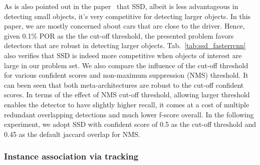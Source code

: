 \documentclass[10pt,twocolumn,letterpaper]{article}
\begin{document}
As is also pointed out in the paper~\cite{huang2017speed} that SSD, albeit is less advantageous in detecting small objects, it's very competitive for detecting larger objects. In this paper, we are mostly concerned about cars that are close to the driver. Hence, given 0.1\% POR as the the cut-off threshold, the presented problem favors detectors that are robust in detecting larger objects.
Tab.~\ref{tab:ssd_fasterrcnn} also verifies that SSD is indeed more competitive when objects of interest are large in our problem set.
We also compare the influence of the cut-off threshold for various confident scores and non-maximum suppression (NMS) threshold. It can been seen that both meta-architectures are robust to the cut-off confident scores.
In terms of the effect of NMS cut-off threshold, allowing larger threshold enables the detector to have slightly higher recall, it comes at a cost of multiple redundant overlapping detections and much lower f-score overall. In the following experiment, we adopt SSD with confident score of 0.5 as the cut-off threshold and 0.45 as the default jaccard overlap for NMS.


\subsubsection{Instance association via tracking}
\end{document}
